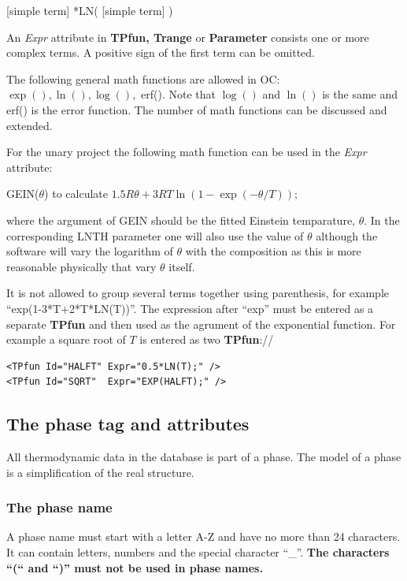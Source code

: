 \documentclass{article}
\begin{document}
[simple term] *LN( [simple term] )

An {\em Expr} attribute in {\bf TPfun, Trange} or {\bf Parameter}
consists one or more complex terms.  A positive sign of the first term
can be omitted.
  
The following general math functions are allowed in OC:\\ $\exp(),
\ln(), \log(),$ erf().  Note that $\log()$ and $\ln()$ is the same and
erf() is the error function.  The number of math functions can be
discussed and extended.

For the unary project the following math function can be used in the
{\em Expr} attribute:

GEIN($\theta$) to calculate $1.5R\theta+3RT\ln(1-\exp(-\theta/T));$

\noindent
where the argument of GEIN should be the fitted Einstein temparature,
$\theta$.  In the corresponding LNTH parameter one will also use the
value of $\theta$ although the software will vary the logarithm of
$\theta$ with the composition as this is more reasonable physically
that vary $\theta$ itself.

It is not allowed to group several terms together using parenthesis,
for example ``exp(1-3*T+2*T*LN(T))''.  The expression after ``exp''
must be entered as a separate {\bf TPfun} and then used as the
agrument of the exponential function.  For example a square root of
$T$ is entered as two {\bf TPfun}://
\begin{verbatim}
<TPfun Id="HALFT" Expr="0.5*LN(T);" />
<TPfun Id="SQRT"  Expr="EXP(HALFT);" />
\end{verbatim}

  
\subsection{The phase tag and attributes}\label{sec:phasetag}

All thermodynamic data in the database is part of a phase.  The model
of a phase is a simplification of the real structure.

\subsubsection{The phase name}\label{sec:phaseid}

A phase name must start with a letter A-Z and have no more than 24
characters.  It can contain letters, numbers and the special character
``\_''.  {\bf The characters ``(`` and ``)'' must not be used in phase
  names.}   
\end{document}
